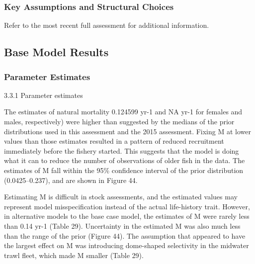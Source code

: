\documentclass[
]{scrartcl}
\begin{document}
\subsubsection{Key Assumptions and Structural
Choices}\label{key-assumptions-and-structural-choices}

Refer to the most recent full assessment for additional information.

\subsection{Base Model Results}\label{base-model-results}

\subsubsection{Parameter Estimates}\label{parameter-estimates}

3.3.1 Parameter estimates

The estimates of natural mortality 0.124599 yr-1 and NA yr-1 for females
and males, respectively) were higher than suggested by the medians of
the prior distributions used in this assessment and the 2015 assessment.
Fixing M at lower values than those estimates resulted in a pattern of
reduced recruitment immediately before the fishery started. This
suggests that the model is doing what it can to reduce the number of
observations of older fish in the data. The estimates of M fall within
the 95\% confidence interval of the prior distribution (0.0425--0.237),
and are shown in Figure 44.

Estimating M is difficult in stock assessments, and the estimated values
may represent model misspecification instead of the actual life-history
trait. However, in alternative models to the base case model, the
estimates of M were rarely less than 0.14 yr-1 (Table 29). Uncertainty
in the estimated M was also much less than the range of the prior
(Figure 44). The assumption that appeared to have the largest effect on
M was introducing dome-shaped selectivity in the midwater trawl fleet,
which made M smaller (Table 29).
\end{document}
